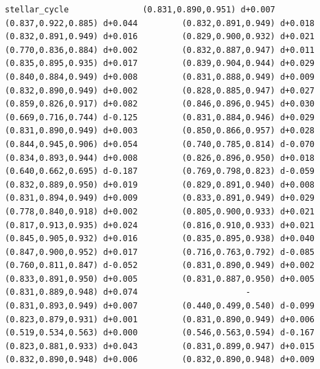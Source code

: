 \documentclass[11pt, letterpaper, openany]{book}
\begin{document}
\begin{empiricalbox}
\begin{lstlisting}[style=terminal]
stellar_cycle               (0.831,0.890,0.951) d+0.007         (0.837,0.922,0.885) d+0.044         (0.832,0.891,0.949) d+0.018         (0.832,0.891,0.949) d+0.016         (0.829,0.900,0.932) d+0.021         (0.770,0.836,0.884) d+0.002         (0.832,0.887,0.947) d+0.011         (0.835,0.895,0.935) d+0.017         (0.839,0.904,0.944) d+0.029         (0.840,0.884,0.949) d+0.008         (0.831,0.888,0.949) d+0.009         (0.832,0.890,0.949) d+0.002         (0.828,0.885,0.947) d+0.027         (0.859,0.826,0.917) d+0.082         (0.846,0.896,0.945) d+0.030         (0.669,0.716,0.744) d-0.125         (0.831,0.884,0.946) d+0.029         (0.831,0.890,0.949) d+0.003         (0.850,0.866,0.957) d+0.028         (0.844,0.945,0.906) d+0.054         (0.740,0.785,0.814) d-0.070         (0.834,0.893,0.944) d+0.008         (0.826,0.896,0.950) d+0.018         (0.640,0.662,0.695) d-0.187         (0.769,0.798,0.823) d-0.059         (0.832,0.889,0.950) d+0.019         (0.829,0.891,0.940) d+0.008         (0.831,0.894,0.949) d+0.009         (0.833,0.891,0.949) d+0.029         (0.778,0.840,0.918) d+0.002         (0.805,0.900,0.933) d+0.021         (0.817,0.913,0.935) d+0.024         (0.816,0.910,0.933) d+0.021         (0.845,0.905,0.932) d+0.016         (0.835,0.895,0.938) d+0.040         (0.847,0.900,0.952) d+0.017         (0.716,0.763,0.792) d-0.085         (0.760,0.811,0.847) d-0.052         (0.831,0.890,0.949) d+0.002         (0.833,0.891,0.950) d+0.005         (0.831,0.887,0.950) d+0.005         (0.831,0.889,0.948) d+0.074                      -                      (0.831,0.893,0.949) d+0.007         (0.440,0.499,0.540) d-0.099         (0.823,0.879,0.931) d+0.001         (0.831,0.890,0.949) d+0.006         (0.519,0.534,0.563) d+0.000         (0.546,0.563,0.594) d-0.167         (0.823,0.881,0.933) d+0.043         (0.831,0.899,0.947) d+0.015         (0.832,0.890,0.948) d+0.006         (0.832,0.890,0.948) d+0.009     

\end{lstlisting}
\end{empiricalbox}
\end{document}

